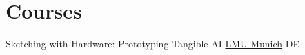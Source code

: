 \section{Courses}
{Sketching with Hardware: Prototyping Tangible AI}
{\href{https://www.lmu.de/en/}{\color{blue}LMU Munich}}
{DE}
{}
